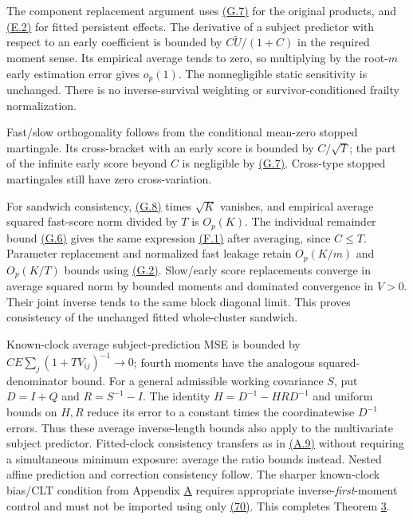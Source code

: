 \documentclass[11pt]{article}
\begin{document}
The component replacement argument uses \hyperref[eq:G.7]{(G.7)} for the original products, and \hyperref[eq:E.2]{(E.2)} for fitted persistent effects. The derivative of a subject predictor with respect to an early coefficient is bounded by \(C\widetilde U/(1+C)\) in the required moment sense. Its empirical average tends to zero, so multiplying by the root-\(m\) early estimation error gives \(o_p(1)\). The nonnegligible static sensitivity is unchanged. There is no inverse-survival weighting or survivor-conditioned frailty normalization.

Fast/slow orthogonality follows from the conditional mean-zero stopped martingale. Its cross-bracket with an early score is bounded by \(C/\sqrt T\); the part of the infinite early score beyond \(C\) is negligible by \hyperref[eq:G.7]{(G.7)}. Cross-type stopped martingales still have zero cross-variation.

For sandwich consistency, \hyperref[eq:G.8]{(G.8)} times \(\sqrt K\) vanishes, and empirical average squared fast-score norm divided by \(T\) is \(O_p(K)\). The individual remainder bound \hyperref[eq:G.6]{(G.6)} gives the same expression \hyperref[eq:F.1]{(F.1)} after averaging, since \(C\leq T\). Parameter replacement and normalized fast leakage retain \(O_p(K/m)\) and \(O_p(K/T)\) bounds using \hyperref[eq:G.2]{(G.2)}. Slow/early score replacements converge in average squared norm by bounded moments and dominated convergence in \(V>0\). Their joint inverse tends to the same block diagonal limit. This proves consistency of the unchanged fitted whole-cluster sandwich.

Known-clock average subject-prediction MSE is bounded by
\(C E\sum_j(1+TV_{ij})^{-1}\to0\); fourth moments have the analogous squared-denominator bound. For a general admissible working covariance \(S\), put \(D=I+Q\) and \(R=S^{-1}-I\). The identity \(H=D^{-1}-HRD^{-1}\) and uniform bounds on \(H,R\) reduce its error to a constant times the coordinatewise \(D^{-1}\) errors. Thus these average inverse-length bounds also apply to the multivariate subject predictor. Fitted-clock consistency transfers as in \hyperref[eq:A.9]{(A.9)} without requiring a simultaneous minimum exposure: average the ratio bounds instead. Nested affine prediction and correction consistency follow. The sharper known-clock bias/CLT condition from Appendix \hyperref[sec:A]{A} requires appropriate inverse-\emph{first}-moment control and must not be imported using only \hyperref[eq:70]{(70)}. This completes Theorem \hyperref[res:Theorem-3]{3}.
\end{document}
